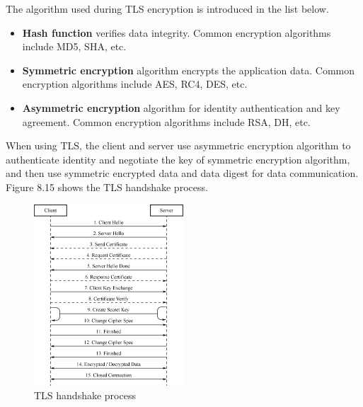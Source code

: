 \documentclass[a4paper,12pt,openany]{book}
\begin{document}
The algorithm used during TLS encryption is introduced in the list below.

\begin{itemize}[noitemsep]
    \item \textbf{Hash function} verifies data integrity. Common encryption algorithms include MD5, SHA, etc.
    \item \textbf{Symmetric encryption} algorithm encrypts the application data. Common encryption algorithms include AES, RC4, DES, etc.
    \item \textbf{Asymmetric encryption} algorithm for identity authentication and key agreement. Common encryption algorithms include RSA, DH, etc.
\end{itemize}

When using TLS, the client and server use asymmetric encryption algorithm to authenticate identity and negotiate the key of symmetric encryption algorithm, and then use symmetric encrypted data and data digest for data communication. Figure 8.15 shows the TLS handshake process.

\begin{figure}[!h]
    \centering
    \includegraphics[width=0.5\textwidth]{D8Z/8-15}
    \caption{TLS handshake process}
\end{figure}
\end{document}
